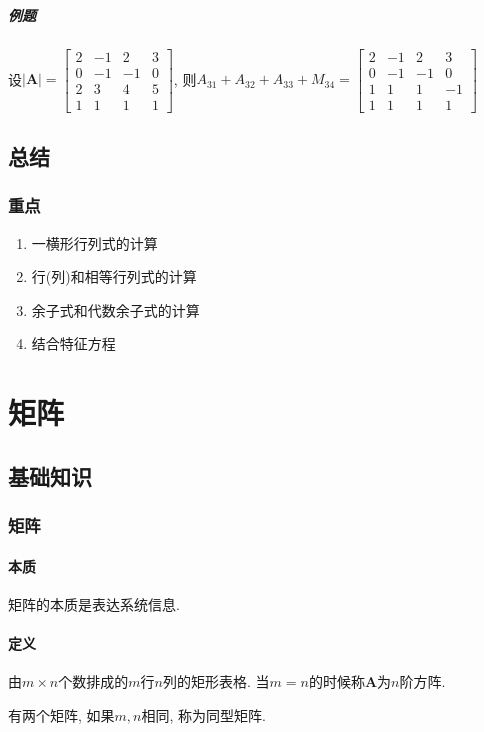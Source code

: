 \paragraph{例题} 设$\bm{|A|}=
\begin{bmatrix}
2 & -1 & 2 & 3 \\
0 & -1 & -1 & 0 \\
2 & 3 & 4 & 5 \\
1 & 1 & 1 & 1
\end{bmatrix}
$, 则$A_{31}+A_{32}+A_{33}+M_{34}=
\begin{bmatrix}
2 & -1 & 2 & 3 \\
0 & -1 & -1 & 0 \\
1 & 1 & 1 & -1 \\
1 & 1 & 1 & 1
\end{bmatrix}
$
\section{总结}
\subsection{重点}
\begin{enumerate}
\item 一横形行列式的计算
\item 行(列)和相等行列式的计算
\item 余子式和代数余子式的计算
\item 结合特征方程
\end{enumerate}
\chapter{矩阵}
\section{基础知识}
\subsection{矩阵}
\subsubsection{本质}
矩阵的本质是表达系统信息.
\subsubsection{定义}
由$ m\times n $个数排成的$ m $行$ n $列的矩形表格. 当$ m=n $的时候称$ \bm{A} $为$ n $阶方阵.\par 有两个矩阵, 如果$ m,n $相同, 称为同型矩阵.
